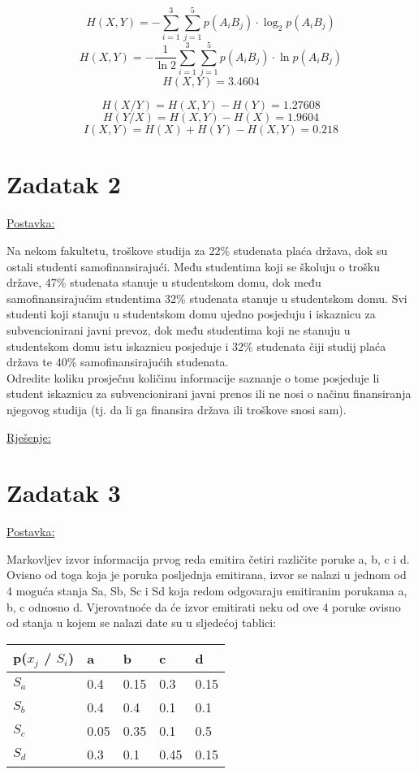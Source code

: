 \documentclass[12pt]{article}
\begin{document}
$$H(X, Y) = - \sum_{i = 1}^{3} \sum_{j = 1}^{5} p(A_i B_j) \cdot \log_2 p(A_i B_j)$$
$$H(X, Y) = - \frac{1}{\ln{2}} \sum_{i = 1}^{3} \sum_{j = 1}^{5} p(A_i B_j) \cdot \ln{p(A_i B_j)}$$
$$H(X, Y) = 3.4604$$

$$H(X / Y) = H(X, Y) - H(Y) = 1.27608$$
$$H(Y / X) = H(X, Y) - H(X) = 1.9604$$
$$I(X, Y) = H(X) + H(Y) - H(X, Y) = 0.218$$

\newpage

\section*{Zadatak 2\label{Z2}}

\underline{Postavka:}

Na nekom fakultetu, troškove studija za 22\% studenata plaća država, dok su ostali studenti samofinansirajući. Među studentima koji se školuju o trošku države, 47\% studenata stanuje u studentskom domu, dok među samofinansirajućim studentima 32\% studenata stanuje u studentskom domu. Svi studenti koji stanuju u studentskom domu ujedno posjeduju i iskaznicu za subvencionirani javni prevoz, dok među studentima koji ne stanuju u studentskom domu istu iskaznicu posjeduje i 32\% studenata čiji studij plaća država te 40\% samofinansirajućih studenata.\\

Odredite koliku prosječnu količinu informacije saznanje o tome posjeduje li student iskaznicu za subvencionirani javni prenos ili ne nosi o načinu finansiranja njegovog studija (tj. da li ga finansira država ili troškove snosi sam).

\underline{Rješenje:}\\


\newpage

\section*{Zadatak 3\label{Z3}}

\underline{Postavka:}

Markovljev izvor informacija prvog reda emitira četiri različite poruke a, b, c i d. Ovisno od toga koja je poruka posljednja emitirana, izvor se nalazi u jednom od 4 moguća stanja Sa, Sb, Sc i Sd koja redom odgovaraju emitiranim porukama a, b, c odnosno d. Vjerovatnoće da će izvor emitirati neku od ove 4 poruke ovisno od stanja u kojem se nalazi date su u sljedećoj tablici: 

\begin{table}[hp]
\centering
\begin{tabular}{|l|l|l|l|l|}
\hline
p($x_j$ / $S_i$) & a    & b    & c    & d    \\ \hline
$S_a$           & 0.4  & 0.15 & 0.3  & 0.15 \\ \hline
$S_b$           & 0.4  & 0.4  & 0.1  & 0.1  \\ \hline
$S_c$           & 0.05 & 0.35 & 0.1  & 0.5  \\ \hline
$S_d$           & 0.3  & 0.1  & 0.45 & 0.15 \\ \hline
\end{tabular}
\end{table}
\end{document}
